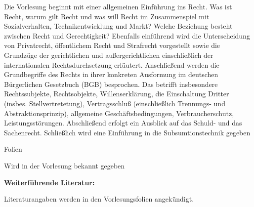 \begin{course}
\begin{content}
Die Vorlesung beginnt mit einer allgemeinen Einführung ins
Recht. Was ist Recht, warum gilt Recht und was will Recht im
Zusammenspiel mit Sozialverhalten, Technikentwicklung und Markt?
Welche Beziehung besteht zwischen Recht und Gerechtigkeit?
Ebenfalls einführend wird die Unterscheidung von Privatrecht,
öffentlichem Recht und Strafrecht vorgestellt sowie die
Grundzüge der gerichtlichen und außergerichtlichen
einschließlich der internationalen Rechtsdurchsetzung
erlüutert. Anschließend werden die Grundbegriffe des
Rechts in ihrer konkreten Ausformung im deutschen Bürgerlichen
Gesetzbuch (BGB) besprochen. Das betrifft insbesondere
Rechtssubjekte, Rechtsobjekte, Willenserklärung, die
Einschaltung Dritter (insbes. Stellvertretetung),
Vertragsschluß (einschließlich Trennungs- und
Abstraktionsprinzip), allgemeine Geschäftsbedingungen,
Verbraucherschutz, Leistungsstörungen. Abschließend
erfolgt ein Ausblick auf das Schuld- und das Sachenrecht.
Schließlich wird eine Einführung in die
Subsumtionstechnik gegeben
\end{content}

\begin{media}Folien\end{media}

\begin{literature}Wird in der Vorlesung bekannt gegeben

\textbf{Weiterführende Literatur:}

Literaturangaben werden in den Vorlesungsfolien angekündigt.

\end{literature}



\end{course}